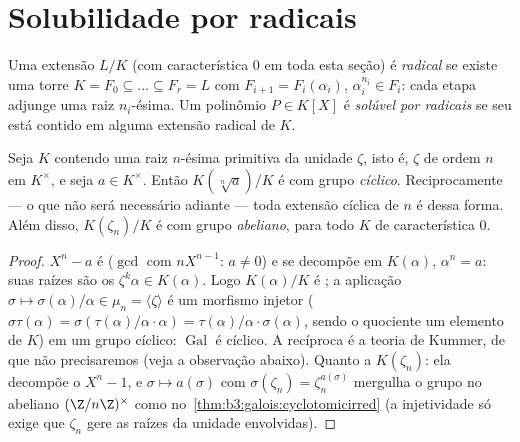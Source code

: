 \section{Solubilidade por radicais}

\begin{definition}\label{def:b3:galois:radical}
Uma extensão $L/K$ (com característica $0$ em toda esta seção)
é \emph{radical} se existe uma torre $K = F_0 \subseteq \dots
\subseteq F_r = L$ com $F_{i+1} = F_i(\alpha_i)$, $\alpha_i^{n_i} \in F_i$: cada etapa
adjunge uma raiz $n_i$-ésima. Um polinômio $P \in K[X]$ é \emph{solúvel
por radicais} se seu 
está contido em alguma extensão radical de $K$.
\end{definition}

\begin{lemma}\label{lem:b3:galois:cyclicsteps}
Seja $K$ contendo uma raiz $n$-ésima primitiva da unidade
$\zeta$, isto é, $\zeta$ de ordem $n$ em $K^\times$, e seja
$a \in K^\times$. Então $K(\sqrt[n]a)/K$ é  com grupo \emph{cíclico}. Reciprocamente
--- o que não será necessário adiante --- toda extensão cíclica de 
$n$ é dessa forma. Além disso, $K(\zeta_n)/K$ é  com grupo
\emph{abeliano}, para todo $K$ de característica $0$.
\end{lemma}

\begin{proof}
$X^n - a$ é  ($\gcd$ com $nX^{n-1}$: $a \neq 0$) e se decompõe em $K(\alpha)$,
$\alpha^n = a$: suas raízes são os $\zeta^k\alpha \in K(\alpha)$. Logo $K(\alpha)/K$ é ; a aplicação
$\sigma \mapsto \sigma(\alpha)/\alpha \in \mu_n = \langle
\zeta\rangle$ é um morfismo injetor ($\sigma\tau(\alpha) =
\sigma(\tau(\alpha)/\alpha \cdot \alpha) =
\tau(\alpha)/\alpha\cdot\sigma(\alpha)$, sendo o quociente um elemento de
$K$) em um grupo cíclico: $\operatorname{Gal}$ é cíclico. A recíproca é a teoria
de Kummer, de que não precisaremos (veja a observação abaixo). Quanto a
$K(\zeta_n)$: ela decompõe o  $X^n -
1$, e $\sigma \mapsto a(\sigma)$ com $\sigma(\zeta_n) =
\zeta_n^{a(\sigma)}$
mergulha o grupo no abeliano $(\Z/n\Z)^\times$ como no~\cref{thm:b3:galois:cyclotomicirred} (a
injetividade só exige que $\zeta_n$ gere as raízes da unidade envolvidas).
\end{proof}

